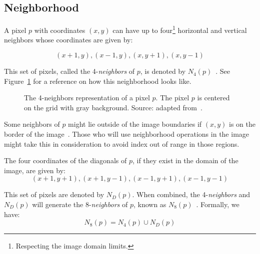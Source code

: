 \subsection{Neighborhood}
\label{sec:neighborhood}
A pixel $p$ with coordinates $(x, y)$ can have up to four\footnote{Respecting the image domain limits.} horizontal and vertical neighbors whose coordinates are given by:

\begin{equation*}
    (x + 1, y), (x - 1, y), (x, y + 1), (x, y - 1)
    \label{eq:n4_neighbors}
\end{equation*}

This set of pixels, called the 4-\textit{neighbors} of $p$, is denoted by $N_4(p)$~\citep{gonzalez:02}. See Figure~\ref{fig:n4-neighbors} for a reference on how this neighborhood looks like.

\begin{figure}[ht]
    \centering

    \caption[The 4-\textit{neighbors} representation of a pixel $p$]{The 4-neighbors representation of a pixel $p$. The pixel $p$ is centered on the grid with gray background. Source: adapted from~\citet{pedrini:08}.}
    \label{fig:n4-neighbors}
\end{figure}

Some neighbors of $p$ might lie outside of the image boundaries if $(x, y)$ is on the border of the image~\citep{gonzalez:02}. Those who will use neighborhood operations in the image might take this in consideration to avoid index out of range in those regions.

The four coordinates of the diagonals of $p$, if they exist in the domain of the image, are given by:
\begin{equation*}
    (x + 1, y + 1), (x + 1, y - 1), (x - 1, y + 1), (x - 1, y - 1)
    \label{eq:nd_neighbors}
\end{equation*}

This set of pixels are denoted by $N_D(p)$. When combined, the 4-\textit{neighbors} and $N_D(p)$ will generate the 8-\textit{neighbors} of $p$, known as $N_8(p)$~\citep{gonzalez:02}. Formally, we have:
\begin{equation*}
    N_8(p) = N_4(p) \cup N_D(p)
    \label{eq:n8_neighbors}
\end{equation*}

